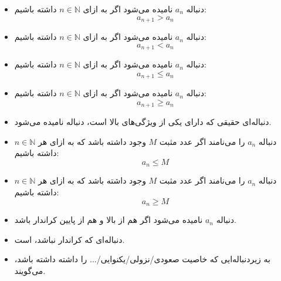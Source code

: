 \begin{DEFINITION}
\begin{itemize}
\item
 دنباله
$a_n$
  نامیده می‌شود اگر به ازای
$n \in \mathbb{N}$
 داشته باشیم:
$$a_{n+1} > a_n$$

\item
 دنباله
$a_n$
  نامیده می‌شود اگر به ازای
$n \in \mathbb{N}$
 داشته باشیم:
$$a_{n+1} < a_n$$

\item
 دنباله
$a_n$
  نامیده می‌شود اگر به ازای
$n \in \mathbb{N}$
 داشته باشیم:
$$a_{n+1} \leq a_n$$

\item
 دنباله
$a_n$
  نامیده می‌شود اگر به ازای
$n \in \mathbb{N}$
 داشته باشیم:
$$a_{n+1} \geq a_n$$

\item
 دنباله‌ای حقیقی  که دارای یکی از ویژگی‌های بالا است، دنباله 
 نامیده می‌شود.
\end{itemize}
\end{DEFINITION}
\begin{DEFINITION}
\begin{itemize}
\item
 دنباله
$a_n$
 را  
  می‌نامند اگر عدد مثبت 
 $M$
 وجود داشته باشد که به ازای هر
$n \in \mathbb{N}$
 داشته باشیم:
$$a_{n} \leq M$$

\item
 دنباله
$a_n$
 را 
  می‌نامند اگر عدد مثبت 
 $M$
 وجود داشته باشد که به ازای هر
$n \in \mathbb{N}$
 داشته باشیم:
$$a_{n} \geq M$$

\item
 دنباله
$a_n$
 نامیده می‌شود اگر هم از بالا و هم از پایین کراندار باشد.

  \item
  دنباله‌ای که کراندار نباشد، 
  است.
  
  \item 
  به زیردنباله‌ایی که خاصیت صعودی/نزولی/یکنوایی/... را داشته داشته باشد، 
  می‌گویند.

\end{itemize}
\end{DEFINITION}

